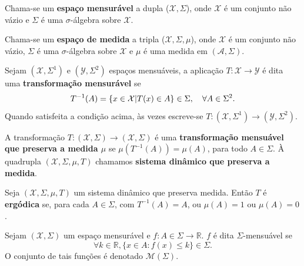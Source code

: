 \begin{definition}
	Chama-se um \textbf{espaço mensurável} a dupla ($\mathcal{X}, \Sigma$), onde $\mathcal{X}$ é um conjunto não vázio e $\Sigma$ é uma $\sigma$-álgebra sobre $\mathcal{X}$.
\end{definition}

\begin{definition}
	Chama-se um \textbf{espaço de medida} a tripla ($\mathcal{X}, \Sigma, \mu$), onde $\mathcal{X}$ é um conjunto não vázio, $\Sigma$ é uma $\sigma$-álgebra sobre $\mathcal{X}$ e $\mu$ é uma medida em $(\mathcal{A}, \Sigma)$. 
\end{definition}

\begin{definition}
	Sejam $(\mathcal{X}, \Sigma^1)$ e $(\mathcal{Y}, \Sigma^2)$ espaços mensuáveis, a aplicação $T\colon \mathcal{X} \to \mathcal{Y}$ é dita uma \textbf{transformação mensurável} se
	\begin{equation*}
		T^{-1}(A) = \{x \in \mathcal{X} \vert T(x) \in A \} \in \Sigma\qc \forall A \in \Sigma^2.
	\end{equation*}
	Quando satisfeita a condição acima, às vezes escreve-se $T \colon (\mathcal{X}, \Sigma^1) \to (\mathcal{Y}, \Sigma^2)$.
\end{definition}

\begin{definition}
	A transformação $T \colon (\mathcal{X}, \Sigma) \to (\mathcal{X}, \Sigma)$ é uma \textbf{transformação mensuável que preserva a medida $\mu$} se $\mu(T^{-1}(A)) = \mu(A)$, para todo $A \in \Sigma$. À quadrupla $(\mathcal{X}, \Sigma, \mu, T)$ chamamos \textbf{sistema dinâmico que preserva a medida}. 
\end{definition}

\begin{definition}
	Seja $(\mathcal{X}, \Sigma, \mu, T)$ um sistema dinâmico que preserva medida. Então $T$ é \textbf{ergódica} se, para cada $A \in \Sigma$, com $T^{-1}(A) = A$, ou $\mu(A) = 1$ ou $\mu(A) = 0$. 
\end{definition}

\begin{definition}
	Sejam $(\mathcal{X}, \Sigma)$ um espaço mensurável e $f\colon A \in \Sigma \to \mathbb{R}$. $f$ é dita $\Sigma$-mensuável se 
	\begin{equation*}
		\forall k \in \mathbb{R}, \{ x \in A \colon f(x) \leq k \} \in \Sigma.
	\end{equation*}
	O conjunto de tais funções é denotado $\mathcal{M}(\Sigma)$.
\end{definition}

